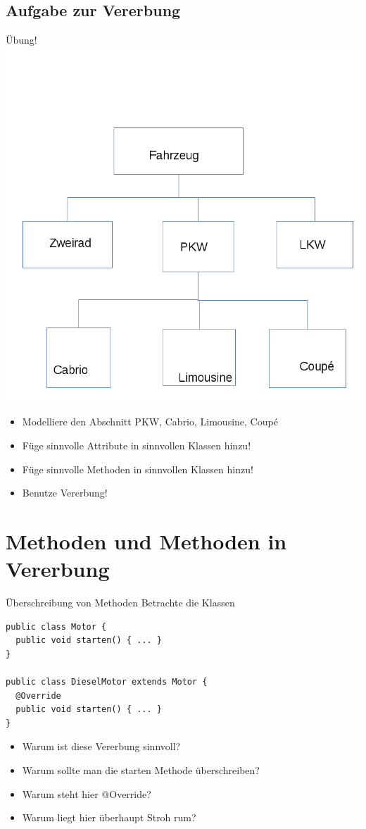 \documentclass[18pt]{beamer}
\begin{document}
\subsection{Aufgabe zur Vererbung}
\begin{frame}{Übung!}
 \includegraphics[scale=0.25]{Fahrzeuge.png}
 \begin{itemize}
  \item Modelliere den Abschnitt PKW, Cabrio, Limousine, Coupé
  \item Füge sinnvolle Attribute in sinnvollen Klassen hinzu!
  \item Füge sinnvolle Methoden in sinnvollen Klassen hinzu!
  \item Benutze Vererbung!
 \end{itemize}

\end{frame}


\section{Methoden und Methoden in Vererbung}
\begin{frame}[fragile]{Überschreibung von Methoden}
Betrachte die Klassen
\begin{lstlisting}
public class Motor {
  public void starten() { ... }
}

public class DieselMotor extends Motor {
  @Override
  public void starten() { ... }
} 
\end{lstlisting}
\pause
\begin{itemize}
 \item Warum ist diese Vererbung sinnvoll? \pause
 \item Warum sollte man die starten Methode überschreiben? \pause
 \item Warum steht hier @Override? \pause
 \item Warum liegt hier überhaupt Stroh rum?
\end{itemize}
\end{frame}
\end{document}
